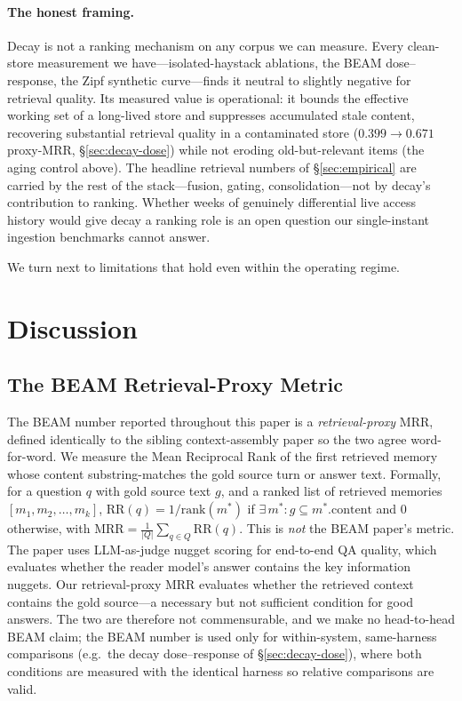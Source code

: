 \documentclass[11pt]{article}
\begin{document}
\paragraph{The honest framing.}  Decay is not a ranking mechanism on
any corpus we can measure.  Every clean-store measurement we
have---isolated-haystack ablations, the BEAM dose--response, the
Zipf synthetic curve---finds it neutral to slightly negative for
retrieval quality.  Its measured value is operational: it bounds the
effective working set of a long-lived store and suppresses
accumulated stale content, recovering substantial retrieval quality
in a contaminated store ($0.399 \to 0.671$ proxy-MRR,
\S\ref{sec:decay-dose}) while not eroding old-but-relevant items
(the aging control above).  The headline retrieval numbers of
\S\ref{sec:empirical} are carried by the rest of the stack---fusion,
gating, consolidation---not by decay's contribution to ranking.
Whether weeks of genuinely differential live access history would
give decay a ranking role is an open question our single-instant
ingestion benchmarks cannot answer.

\medskip
\noindent We turn next to limitations that hold even within the
operating regime.

\section{Discussion}
\label{sec:discussion}

\subsection{The BEAM Retrieval-Proxy Metric}
\label{sec:beam-proxy}

The BEAM number reported throughout this paper is a
\emph{retrieval-proxy} MRR, defined identically to the sibling
context-assembly paper so the two agree word-for-word.  We measure
the Mean Reciprocal Rank of the first retrieved memory whose content
substring-matches the gold source turn or answer text.  Formally,
for a question $q$ with gold source text $g$, and a ranked list of
retrieved memories $[m_1, m_2, \ldots, m_k]$,
$\text{RR}(q) = 1/\text{rank}(m^*)$ if $\exists\, m^* : g \subseteq
m^*.\text{content}$ and $0$ otherwise, with
$\text{MRR} = \frac{1}{|Q|} \sum_{q \in Q} \text{RR}(q)$.  This is
\emph{not} the BEAM paper's metric.  The paper uses LLM-as-judge
nugget scoring for end-to-end QA quality, which evaluates whether
the reader model's answer contains the key information nuggets.  Our
retrieval-proxy MRR evaluates whether the retrieved context contains
the gold source---a necessary but not sufficient condition for good
answers.  The two are therefore not commensurable, and we make no
head-to-head BEAM claim; the BEAM number is used only for
within-system, same-harness comparisons (e.g.\ the decay
dose--response of \S\ref{sec:decay-dose}), where both conditions are
measured with the identical harness so relative comparisons are
valid.
\end{document}
